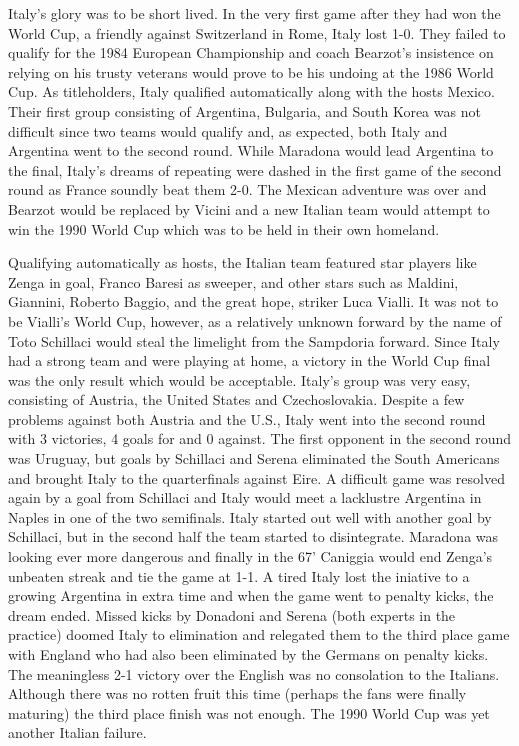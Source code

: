 Italy's glory was to be short lived. In the very first game after they had won 
the World Cup, a friendly against Switzerland in Rome, Italy lost 1-0. They 
failed to qualify for the 1984 European Championship and coach Bearzot's 
insistence on relying on his trusty veterans would prove to be his undoing at 
the 1986 World Cup. As titleholders, Italy qualified automatically along with 
the hosts Mexico. Their first group consisting of Argentina, Bulgaria, and 
South Korea was not difficult since two teams would qualify and, as expected, 
both Italy and Argentina went to the second round. While Maradona would lead 
Argentina to the final, Italy's dreams of repeating were dashed in the first 
game of the second round as France soundly beat them 2-0. The Mexican adventure 
was over and Bearzot would be replaced by Vicini and a new Italian team would 
attempt to win the 1990 World Cup which was to be held in their own homeland.

Qualifying automatically as hosts, the Italian team featured star players like 
Zenga in goal, Franco Baresi as sweeper, and other stars such as Maldini, 
Giannini, Roberto Baggio, and the great hope, striker Luca Vialli. It was not 
to be Vialli's World Cup, however, as a relatively unknown forward by the name 
of Toto Schillaci would steal the limelight from the Sampdoria forward. Since 
Italy had a strong team and were playing at home, a victory in the World Cup 
final was the only result which would be acceptable. Italy's group was very 
easy, consisting of Austria, the United States and Czechoslovakia. Despite a 
few problems against both Austria and the U.S., Italy went into the second 
round with 3 victories, 4 goals for and 0 against. The first opponent in the
second round was Uruguay, but goals by Schillaci and Serena eliminated the 
South Americans and brought Italy to the quarterfinals against Eire. A difficult 
game was resolved again by a goal from Schillaci and Italy would meet a 
lacklustre Argentina in Naples in one of the two semifinals. Italy started out 
well with another goal by Schillaci, but in the second half the team started 
to disintegrate. Maradona was looking ever more dangerous and finally in the 67' 
Caniggia would end Zenga's unbeaten streak and tie the game at 1-1. A tired 
Italy lost the iniative to a growing Argentina in extra time and when the game 
went to penalty kicks, the dream ended. Missed kicks by Donadoni and Serena 
(both experts in the practice) doomed Italy to elimination and relegated them 
to the third place game with England who had also been eliminated by the Germans 
on penalty kicks. The meaningless 2-1 victory over the English was no 
consolation to the Italians. Although there was no rotten fruit this time 
(perhaps the fans were finally maturing) the third place finish was not enough.
The 1990 World Cup was yet another Italian failure.
